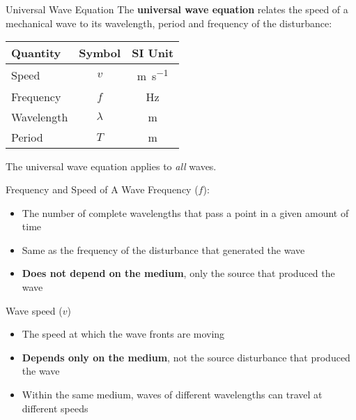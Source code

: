 \documentclass[12pt,aspectratio=169]{beamer}
\newcommand{\eq}[2]{\vspace{#1}{\Large\begin{displaymath}#2\end{displaymath}}}
\begin{document}
\begin{frame}{Universal Wave Equation}
  The \textbf{universal wave equation} relates the speed of a mechanical wave
  to its wavelength, period and frequency of the disturbance:

  \eq{-.15in}{
    \boxed{v = f\lambda =\frac{\lambda}{T}}
  }
  \begin{center}
    \begin{tabular}{l|c|c}
      \rowcolor{pink}
      \textbf{Quantity} & \textbf{Symbol} & \textbf{SI Unit} \\ \hline
      Speed         & $v$       & \si{\metre\per\second} \\
      Frequency     & $f$       & \si{\hertz} \\
      Wavelength    & $\lambda$ & \si{\metre} \\
      Period        & $T$       & \si{\metre} 
    \end{tabular}
  \end{center}
  The universal wave equation applies to \emph{all} waves. %
\end{frame}



\begin{frame}{Frequency and Speed of A Wave}
  Frequency ($f$):
  \begin{itemize}
  \item The number of complete wavelengths that pass a point in a given amount
    of time
  \item Same as the frequency of the disturbance that generated the wave
  \item\textbf{Does not depend on the medium}, only the source that produced
    the wave
  \end{itemize}

  \vspace{.2in}Wave speed ($v$)
  \begin{itemize}
  \item The speed at which the wave fronts are moving
  \item \textbf{Depends only on the medium}, not the source disturbance that
    produced the wave
  \item Within the same medium, waves of different wavelengths can travel
    at different speeds
  \end{itemize}
\end{frame}
\end{document}
